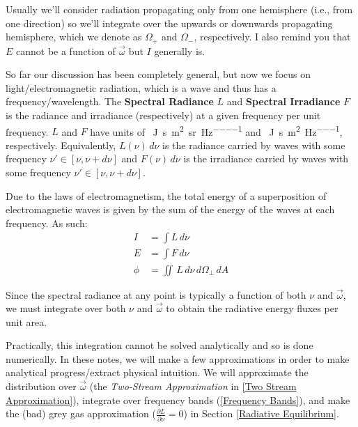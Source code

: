 Usually we'll consider radiation propagating only from one hemisphere (i.e., from one direction) so we'll integrate over the upwards or downwards propagating hemisphere, which we denote as $\Omega_+$ and $\Omega_-$, respectively. I also remind you that $E$ cannot be a function of $\vec{\omega}$ but $I$ generally is.

So far our discussion has been completely general, but now we focus on light/electromagnetic radiation, which is a wave and thus has a frequency/wavelength. The \textbf{Spectral Radiance} $L$ and \textbf{Spectral Irradiance} $F$ is the radiance and irradiance (respectively) at a given frequency per unit frequency. $L$ and $F$ have units of \qty{}{\joule\per\second\per\metre\squared\per\steradian\per\hertz} and \qty{}{\joule\per\second\per\metre\squared\per\hertz}, respectively. Equivalently, $L(\nu)\,d\nu$ is the radiance carried by waves with some frequency $\nu'\in[\nu,\nu+d\nu]$ and $F(\nu)\,d\nu$ is the irradiance carried by waves with some frequency $\nu'\in[\nu,\nu+d\nu]$. 

Due to the laws of electromagnetism, the total energy of a superposition of electromagnetic waves is given by the sum of the energy of the waves at each frequency. As such:
\begin{align}
    I&=\int L\,d\nu\\
    E&=\int F\, d\nu\\
    \phi&=\iint\,L\,d\nu\,d\Omega_\perp\,dA
\end{align}

Since the spectral radiance at any point is typically a function of both $\nu$ and $\vec{\omega}$, we must integrate over both $\nu$ and $\vec{\omega}$ to obtain the radiative energy fluxes per unit area. 

Practically, this integration cannot be solved analytically and so is done numerically. In these notes, we will make a few approximations in order to make analytical progress/extract physical intuition. We will approximate the distribution over $\vec{\omega}$ (the \textit{Two-Stream Approximation} in \ref{Two Stream Approximation}), integrate over frequency bands (\ref{Frequency Bands}), and make the (bad) grey gas approximation ($\frac{\partial L}{\partial \nu}=0$) in Section \ref{Radiative Equilibrium}.

